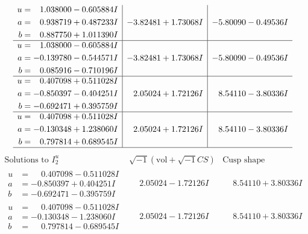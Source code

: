 \documentclass[1p]{elsarticle_modified}
\theoremstyle{definition}
\newcommand{\I}{\sqrt{-1}}
\begin{document}
$$\begin{array}{c|c|c}
\begin{aligned}
u &= \phantom{-}1.038000 - 0.605884 I \\
a &= \phantom{-}0.938719 + 0.487233 I \\
b &= \phantom{-}0.887750 + 1.011390 I\end{aligned}
 & -3.82481 + 1.73068 I & -5.80090 - 0.49536 I \\ \hline\begin{aligned}
u &= \phantom{-}1.038000 - 0.605884 I \\
a &= -0.139780 - 0.544571 I \\
b &= \phantom{-}0.085916 - 0.710196 I\end{aligned}
 & -3.82481 + 1.73068 I & -5.80090 - 0.49536 I \\ \hline\begin{aligned}
u &= \phantom{-}0.407098 + 0.511028 I \\
a &= -0.850397 - 0.404251 I \\
b &= -0.692471 + 0.395759 I\end{aligned}
 & \phantom{-}2.05024 + 1.72126 I & \phantom{-}8.54110 - 3.80336 I \\ \hline\begin{aligned}
u &= \phantom{-}0.407098 + 0.511028 I \\
a &= -0.130348 + 1.238060 I \\
b &= \phantom{-}0.797814 + 0.689545 I\end{aligned}
 & \phantom{-}2.05024 + 1.72126 I & \phantom{-}8.54110 - 3.80336 I\\
 \hline 
 \end{array}$$\newpage$$\begin{array}{c|c|c}  
\text{Solutions to }I^u_{2}& \I (\text{vol} + \sqrt{-1}CS) & \text{Cusp shape}\\
 \hline 
\begin{aligned}
u &= \phantom{-}0.407098 - 0.511028 I \\
a &= -0.850397 + 0.404251 I \\
b &= -0.692471 - 0.395759 I\end{aligned}
 & \phantom{-}2.05024 - 1.72126 I & \phantom{-}8.54110 + 3.80336 I \\ \hline\begin{aligned}
u &= \phantom{-}0.407098 - 0.511028 I \\
a &= -0.130348 - 1.238060 I \\
b &= \phantom{-}0.797814 - 0.689545 I\end{aligned}
 & \phantom{-}2.05024 - 1.72126 I & \phantom{-}8.54110 + 3.80336 I \\ \hline\begin{aligned}

\end{aligned}
\end{array}$$
\end{document}
